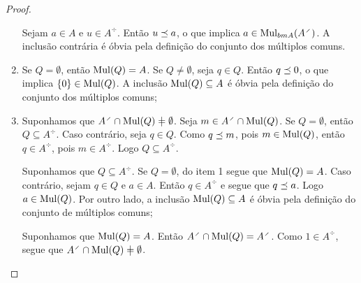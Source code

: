 \begin{proof}
\begin{enumerate}
	Sejam $a \in A$ e $u \in A^{\div}$. Então $u \preceq a$, o que implica $a \in \mul_{\\bm A}(A^{\div})$. A inclusão contrária é óbvia pela definição do conjunto dos múltiplos comuns.

	\item Se $Q = \emptyset$, então $\operatorname{Mul}(Q) = A$. Se $Q \neq \emptyset$, seja $q \in Q$. Então $q \preceq 0$, o que implica $\{0\} \in \operatorname{Mul}(Q)$. A inclusão $\operatorname{Mul}(Q) \subseteq A$ é óbvia pela definição do conjunto dos múltiplos comuns;

	\item Suponhamos que $A^{\div} \cap \mul(Q) \neq \emptyset$. Seja $m \in A^{\div} \cap \mul(Q)$. Se $Q = \emptyset$, então $Q \subseteq A^{\div}$. Caso contrário, seja $q \in Q$. Como $q \preceq m$, pois $m \in \operatorname{Mul}(Q)$, então $q \in A^{\div}$, pois $m \in A^{\div}$. Logo $Q \subseteq A^{\div}$.

	Suponhamos que $Q \subseteq A^{\div}$. Se $Q = \emptyset$, do item 1 segue que $\operatorname{Mul}(Q)=A$. Caso contrário, sejam $q \in Q$ e $a \in A$. Então $q \in A^{\div}$ e segue que $q \preceq a$. Logo $a \in \operatorname{Mul}(Q)$. Por outro lado, a  inclusão $\operatorname{Mul}(Q) \subseteq A$ é óbvia pela definição do conjunto de múltiplos comuns;

	Suponhamos que $\operatorname{Mul}(Q) = A$. Então $A^{\div} \cap \mul(Q) = A^{\div}$. Como $1 \in A^{\div}$, segue que $A^{\div} \cap \mul(Q) \neq \emptyset$. \qedhere
	\end{enumerate}
\end{proof}




